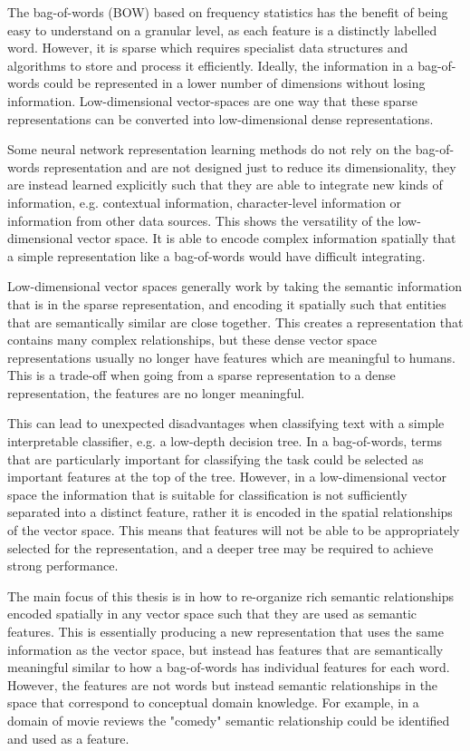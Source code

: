 The bag-of-words (BOW) based on frequency statistics has the benefit of being easy to understand on a granular level, as each feature is a distinctly labelled word. However, it is sparse which requires specialist data structures and algorithms to store and process it efficiently. Ideally, the  information in a bag-of-words could be represented in a lower number of dimensions without losing information. Low-dimensional vector-spaces are one way that these sparse representations can be converted into low-dimensional dense representations. 

Some neural network representation learning methods do not rely on the bag-of-words representation and are not designed just to reduce its dimensionality, they are instead learned explicitly such that they are able to integrate new kinds of information, e.g. contextual information, character-level information or information from other data sources. This shows the versatility of the low-dimensional vector space. It is able to encode complex information spatially that a simple representation like a bag-of-words would have difficult integrating.

Low-dimensional vector spaces generally work by taking the semantic information that is in the sparse representation, and encoding it spatially such that entities that are semantically similar are close together. This creates a representation that contains many complex relationships, but these dense vector space representations usually no longer have features which are meaningful to humans. This is a trade-off when going from a sparse representation to a dense representation, the features are no longer meaningful. 

This can lead to unexpected disadvantages when classifying text with a simple interpretable classifier, e.g. a low-depth decision tree. In a bag-of-words, terms that are particularly important for classifying the task could be selected as important features at the top of the tree. However, in a low-dimensional vector space the information that is suitable for classification is not sufficiently separated into a distinct feature, rather it is encoded in the spatial relationships of the vector space. This means that features will not be able to be appropriately selected for the representation, and a deeper tree may be required to achieve strong performance.

The main focus of this thesis is in how to re-organize rich semantic relationships encoded spatially in any vector space  such that they are used as semantic features. This is essentially producing a new representation that uses the same information as the vector space, but instead has features that are semantically meaningful similar to how a bag-of-words has individual features for each word. However, the features are not words but instead semantic relationships in the space that correspond to conceptual domain knowledge. For example, in a domain of movie reviews the "comedy" semantic relationship could be identified and used as a feature.


